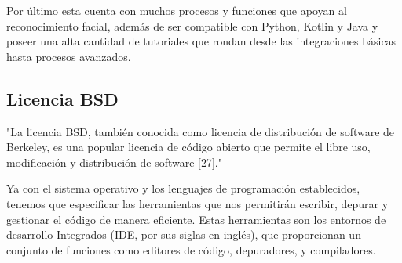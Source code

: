 Por último esta cuenta con muchos procesos y funciones que apoyan al reconocimiento facial, además de ser compatible con Python, Kotlin y Java y poseer una alta cantidad de tutoriales que rondan desde las integraciones básicas hasta procesos avanzados.

\subsection{Licencia BSD}

\begin{list}{}%
    {\setlength{\leftmargin}{1cm}\setlength{\rightmargin}{1cm}}
    \item\relax
    \small

"La licencia BSD, también conocida como licencia de distribución de software de Berkeley, es una popular licencia de código abierto que permite el libre uso, modificación y distribución de software [27]."

\end{list}

Ya con el sistema operativo y los lenguajes de programación establecidos, tenemos que especificar las herramientas que nos permitirán escribir, depurar y gestionar el código de manera eficiente. Estas herramientas son los entornos de desarrollo Integrados (IDE, por sus siglas en inglés), que proporcionan un conjunto de funciones como editores de código, depuradores, y compiladores.

